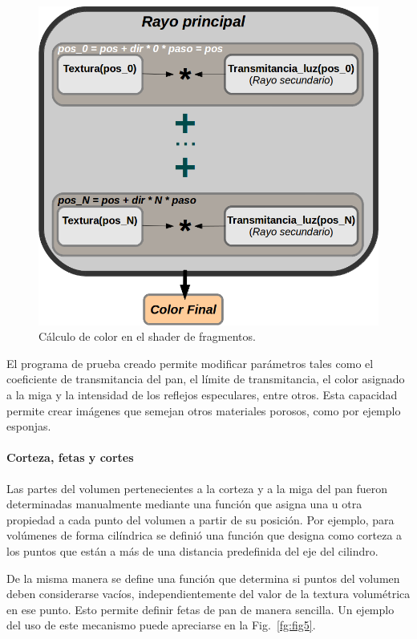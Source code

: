 \documentclass[spanish,a4paper,openright,11pt]{book}
\begin{document}
\begin{figure}[htb!]
  \centerline{\includegraphics[scale=0.5]{fragmentshader}}
  \caption{Cálculo de color en el shader de fragmentos. }
  \label{fg:fragmentshader}
\end{figure}


El programa de prueba creado permite modificar parámetros tales como el coeficiente de transmitancia del pan, el límite de transmitancia, el color asignado a la miga y la intensidad de los reflejos especulares, entre otros. Esta capacidad permite crear imágenes que semejan otros
materiales porosos, como por ejemplo esponjas.

\paragraph{Corteza, fetas y cortes}

Las partes del volumen pertenecientes a la corteza y a la miga del pan fueron determinadas manualmente mediante una función que asigna una u otra propiedad a cada punto del volumen a partir de su posición. Por ejemplo, para volúmenes de forma cilíndrica se definió una función que designa como corteza a los puntos que están a más de una distancia predefinida del eje del cilindro.

De la misma manera se define una función que determina si puntos del volumen deben considerarse vacíos, independientemente del valor de la textura volumétrica en ese punto. Esto permite definir fetas de pan de manera sencilla. Un ejemplo del uso de este mecanismo puede apreciarse
en la Fig.~\ref{fg:fig5}.
\end{document}
